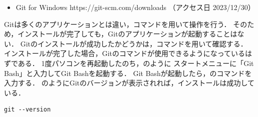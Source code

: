 \begin{itemize}
  \item Git for Windows https://git-scm.com/downloads （アクセス日 2023/12/30）
\end{itemize}

Gitは多くのアプリケーションとは違い，コマンドを用いて操作を行う．
そのため，インストールが完了しても，Gitのアプリケーションが起動することはない．
Gitのインストールが成功したかどうかは，コマンドを用いて確認する．
インストールが完了した場合，Gitのコマンドが使用できるようになっているはずである．
1度パソコンを再起動したのち，のように
スタートメニューに「Git Bash」と入力してGit Bashを起動する．
Git Bashが起動したら，のコマンドを入力する．
のようにGitのバージョンが表示されれば，インストールは成功している．
\\
\begin{lstlisting}[caption=Gitのバージョン確認コマンド, label=lst:git_version]
  git --version
\end{lstlisting}


